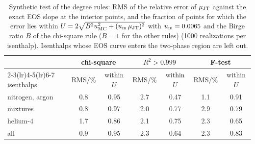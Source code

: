 \begin{table}[h]
  \centering
  \footnotesize
  \caption{\label{tab:si_synth}Synthetic test of the degree rules: RMS of the relative error of $\mu_{\rm JT}$ against the exact EOS slope at the interior points, and the fraction of points for which the error lies within $U = 2\sqrt{B^2 u_{\rm MC}^2 + (u_{\rm m}\,\mu_{\rm JT})^2}$ with $u_{\rm m} = 0.0065$ and the Birge ratio $B$ of the chi-square rule ($B = 1$ for the other rules) (1000 realizations per isenthalp). Isenthalps whose EOS curve enters the two-phase region are left out.}
  \begin{tabular}{lcccccc}
    \toprule
    & \multicolumn{2}{c}{chi-square} & \multicolumn{2}{c}{$R^2 > 0.999$} & \multicolumn{2}{c}{F-test} \\
    \cmidrule(lr){2-3}\cmidrule(lr){4-5}\cmidrule(lr){6-7}
    isenthalps & RMS/\% & within $U$ & RMS/\% & within $U$ & RMS/\% & within $U$ \\
    \midrule
    nitrogen, argon & 0.8 & 0.95 & 2.7 & 0.47 & 1.1 & 0.91 \\
    mixtures & 0.8 & 0.97 & 2.0 & 0.77 & 2.9 & 0.79 \\
    helium-4 & 1.7 & 0.86 & 2.1 & 0.75 & 2.3 & 0.65 \\
    all & 0.9 & 0.95 & 2.3 & 0.64 & 2.3 & 0.83 \\
    \bottomrule
  \end{tabular}
\end{table}

